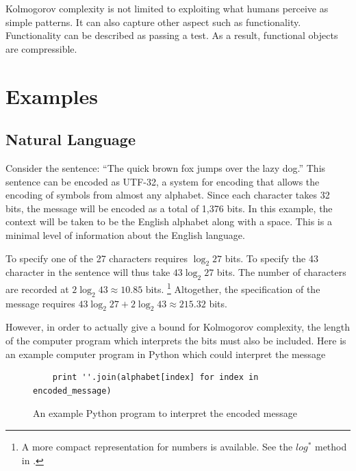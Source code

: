 Kolmogorov complexity is not limited to exploiting what humans perceive as simple patterns.
It can also capture other aspect such as functionality.
Functionality can be described as passing a test.
As a result, functional objects are compressible.

\section{Examples}
\subsection{Natural Language}
Consider the sentence: ``The quick brown fox jumps over the lazy dog.''
This sentence can be encoded as UTF-32, a system for encoding that allows the encoding of symbols from almost any alphabet.
Since each character takes 32 bits, the message will be encoded as a total of 1,376 bits.
In this example, the context will be taken to be the English alphabet along with a space.
This is a minimal level of information about the English language.

To specify one of the 27 characters requires $\log_2 27$ bits. 
To specify the 43 character in the sentence will thus take $43 \log_2 27$ bits.
The number of characters are recorded at $2 \log_2 43 \approx 10.85$ bits. 
\footnote{A more compact representation for numbers is available. See the $log^*$ method in \citet{Cover2006}.}
Altogether, the specification of the message requires $43 \log_2 27 + 2 \log_2 43 \approx 215.32$ bits. 


However, in order to actually give a bound for Kolmogorov complexity, the length of the computer program which interprets the bits must also be included.
Here is an example computer program in Python which could interpret the message
\begin{figure}[H]
\begin{mdframed}
\begin{verbatim}
    print ''.join(alphabet[index] for index in encoded_message)
\end{verbatim}
\end{mdframed}
\caption{An example Python program to interpret the encoded message}
\end{figure}

